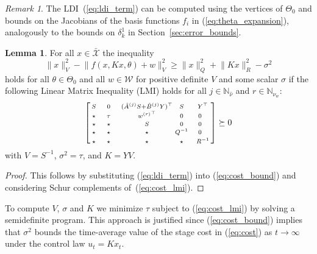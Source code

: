 \documentclass{IEEEtran}
\theoremstyle{definition}
\newtheorem{lemma}{Lemma}
\theoremstyle{remark}
\newtheorem{remark}{Remark}
\begin{document}
\begin{remark}
The LDI~(\ref{eq:ldi_term}) can be computed using the vertices of $\Theta_0$ and bounds on the Jacobians of the basis functions $f_i$ in (\ref{eq:theta_expansion}), analogously to the bounds on $\delta_k^1$ in Section~\ref{sec:error_bounds}.
\end{remark}

\begin{lemma} \label{lem:cost_bound}
For all $x\in\bar{\mathcal{X}}$
the inequality
\begin{equation} \label{eq:cost_bound}
\lVert x \rVert^2_V - \lVert f(x,Kx,\theta) +w \rVert^2_V
\geq \lVert x \rVert^2_Q +  \lVert K x  \rVert^2_R - \sigma^2
\end{equation}
holds for all $\theta\in \Theta_0$ and all $w\in\mathcal{W}$ for positive definite $V$ and some scalar $\sigma$ if the following Linear Matrix Inequality (LMI) holds for all $j\in \mathbb{N}_{\hat{\nu}}$ and $ r \in \mathbb{N}_{\nu_w}$:%
\def\strut{\rule{0pt}{8pt}}%
\begin{equation} \label{eq:cost_lmi}
\left[\begin{smallmatrix}
S & ~~~0~~~ & (\hat{A}^{(j)}S + \hat{B}^{(j)}Y)^\top & S & ~~Y^\top \\
\star & \tau & {w^{(r)}}^\top & 0 & 0 \\
\star\strut & \star & S & 0 & 0 \\
\star\strut & \star & \star & Q^{-1} & 0 \\
\star\strut & \star & \star & \star & ~~R^{-1}
\end{smallmatrix}\right] \succeq 0
\end{equation} with $V=S^{-1}$, $\sigma^2=\tau$, and $K =YV$.
\end{lemma}

\begin{proof}
This follows by substituting (\ref{eq:ldi_term}) into (\ref{eq:cost_bound})
and considering Schur complements of~(\ref{eq:cost_lmi}).
\end{proof}

To compute $V$, $\sigma$ and $K$ we minimize $\tau$ subject to (\ref{eq:cost_lmi}) by solving a semidefinite program. This approach is justified since (\ref{eq:cost_bound}) implies that $\sigma^2$ bounds the time-average value of the stage cost in (\ref{eq:cost}) as $t\to\infty$ under the control law $u_t=Kx_t$.
\end{document}
